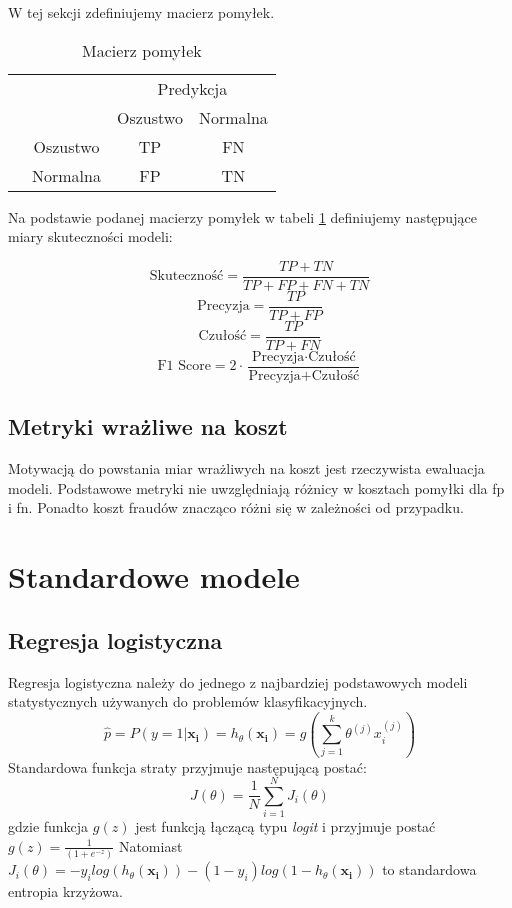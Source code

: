 \documentclass{book}
\begin{document}
W tej sekcji zdefiniujemy macierz pomyłek.
\begin{table}[h]
	\begin{center}
		\makegapedcells
		\begin{tabular}{cc|cc}
			\multicolumn{2}{c}{}     &   \multicolumn{2}{c}{Predykcja} \\
			&            &   Oszustwo &   Normalna     \\ 
			\cline{2-4}
			\multirow{2}{*}{\rotatebox[origin=c]{90}{Prawda}} & Oszustwo   & TP         & FN              \\
			& Normalna   & FP         & TN              \\ 
			\cline{2-4}
		\end{tabular}
	\end{center}
	\caption{Macierz pomyłek}
	\label{macierz-pomylek}
\end{table}


Na podstawie podanej macierzy pomyłek w tabeli \ref{macierz-pomylek} definiujemy następujące miary skuteczności modeli:

$$ \text{Skuteczność} = \frac{TP + TN}{TP + FP + FN + TN} $$
$$ \text{Precyzja} = \frac{TP}{TP + FP} $$
$$ \text{Czułość}= \frac{TP}{TP + FN} $$
$$ \text{F1 Score} = 2 \cdot \frac{\text{Precyzja} \cdot \text{Czułość}}{\text{Precyzja} + \text{Czułość}} $$

\subsection{Metryki wrażliwe na koszt}

Motywacją do powstania miar wrażliwych na koszt jest rzeczywista ewaluacja modeli. Podstawowe metryki nie uwzględniają różnicy w kosztach pomyłki dla fp i fn. Ponadto koszt fraudów znacząco różni się w zależności od przypadku.

\section{Standardowe modele}

\subsection{Regresja logistyczna}

	Regresja logistyczna należy do jednego z najbardziej podstawowych modeli statystycznych używanych do problemów klasyfikacyjnych. 
	\begin{equation}
		\hat{p} = P(y=1|\boldsymbol{x_i}) = h_{\theta}(\boldsymbol{x_i}) = g\left(\sum_{j=1}^k \theta^{(j)}x_i^{(j)} \right)
	\end{equation} 
	Standardowa funkcja straty przyjmuje następującą postać:
	$$ J(\theta) = \frac{1}{N} \sum_{i=1}^N J_i(\theta) $$
	gdzie funkcja $g(z)$ jest funkcją łączącą typu \textit{logit} i przyjmuje postać $ \displaystyle g(z) = \frac{1}{(1+e^{-z})} $
	Natomiast $ \displaystyle J_i(\theta) = -y_i log(h_{\theta}(\boldsymbol{x_i})) - (1-y_i) log(1 - h_{\theta}(\boldsymbol{x_i})) $ to standardowa entropia krzyżowa.
\end{document}
